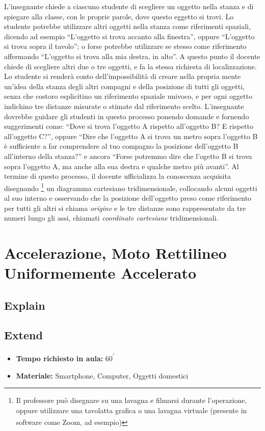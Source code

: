 \documentclass{report} \usepackage[T1]{fontenc} \usepackage[italian]{babel}
\begin{document}
L'insegnante chiede a ciascuno studente di scegliere un oggetto nella stanza e di
spiegare alla classe, con le proprie parole, dove questo eggetto si trovi.
Lo studente potrebbe utilizzare altri oggetti nella stanza come riferimenti spaziali,
dicendo ad esempio ``L'oggetto si trova accanto alla finestra'', oppure
``L'oggetto si trova sopra il tavolo''; o forse potrebbe utilizzare se stesso come
riferimento affermando ``L'oggetto si trova alla mia destra, in alto''.
A questo punto il docente chiede di scegliere altri due o tre oggetti,
e fa la stessa richiesta di localizzazione. Lo studente si renderà
conto dell'impossibilità di creare nella propria mente un'idea della stanza
degli altri compagni e della posizione di tutti gli oggetti, senza che
costoro esplicitino un riferimento spaziale univoco, e per ogni oggetto indichino tre distanze
misurate o stimate dal riferimento scelto.
L'insegnante dovrebbe guidare gli studenti in questo processo ponendo domande e fornendo suggerimenti
come: ``Dove si trova l'oggetto A rispetto all'oggetto B? E rispetto all'oggetto C?'',
oppure ``Dire che l'oggetto A si trova un metro sopra l'oggetto B è sufficiente
a far comprendere al tuo compagno la posizione dell'oggetto B all'interno della stanza?''
e ancora ``Forse potremmo dire che l'ogetto B si trova sopra l'oggetto A, ma anche alla sua destra
e qualche metro più avanti''.
Al termine di questo processo, il docente ufficializza la conoscenza acquisita disegnando
\footnote{
Il professore può disegnare su una lavagna e filmarsi durante l'operazione, oppure
utilizzare una tavolatta grafica o una lavagna virtuale (presente in software
come Zoom\textsuperscript{\textregistered}, ad esempio)
}          
un diagramma cartesiano tridimensionale, collocando alcuni oggetti al suo interno
e osservando che la posizione dell'oggetto preso come riferimento per tutti gli altri
si chiama \emph{origine} e le tre distanze sono rappresentate da tre numeri lungo
gli assi, chiamati \emph{coordinate cartesiane} tridimensionali.

\chapter{Accelerazione, Moto Rettilineo Uniformemente Accelerato}
\section{Explain}\label{a_explain}

\section{Extend}
\begin{itemize}
\item \textbf{Tempo richiesto in aula:} 60\textsuperscript{$\prime$}
\item \textbf{Materiale:} Smartphone, Computer, Oggetti domestici
\end{itemize}
\end{document}
